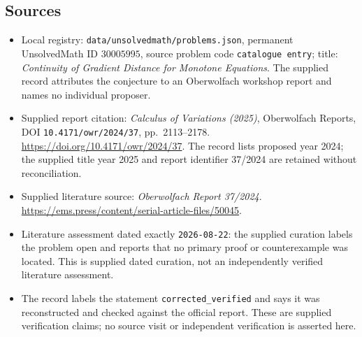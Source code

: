 \documentclass[11pt]{article}
\begin{document}
\subsection{Sources}
\begin{itemize}
\item Local registry: \texttt{data/unsolvedmath/problems.json}, permanent UnsolvedMath ID \(30005995\), source problem code \texttt{catalogue entry}; title: \emph{Continuity of Gradient Distance for Monotone Equations}. The supplied record attributes the conjecture to an Oberwolfach workshop report and names no individual proposer.
\item Supplied report citation: \emph{Calculus of Variations (2025)}, Oberwolfach Reports, DOI \texttt{10.4171/owr/2024/37}, pp.~2113--2178. \url{https://doi.org/10.4171/owr/2024/37}. The record lists proposed year 2024; the supplied title year 2025 and report identifier 37/2024 are retained without reconciliation.
\item Supplied literature source: \emph{Oberwolfach Report 37/2024}. \url{https://ems.press/content/serial-article-files/50045}.
\item Literature assessment dated exactly \texttt{2026-08-22}: the supplied curation labels the problem open and reports that no primary proof or counterexample was located. This is supplied dated curation, not an independently verified literature assessment.
\item The record labels the statement \texttt{corrected\_verified} and says it was reconstructed and checked against the official report. These are supplied verification claims; no source visit or independent verification is asserted here.
\end{itemize}
\end{document}
